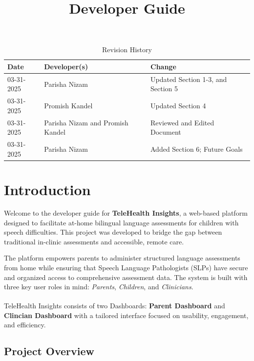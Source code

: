 \documentclass{article}
\title{Developer Guide\\\progname}
\author{\authname}
\date{}
\begin{document}
\maketitle
\newpage

\begin{table}[h!]
\caption{Revision History} \label{TblRevisionHistory}
\begin{tabularx}{\textwidth}{llX}
\toprule
\textbf{Date} & \textbf{Developer(s)} & \textbf{Change}\\
\midrule
03-31-2025 & Parisha Nizam & Updated Section 1-3, and Section 5\\
03-31-2025 & Promish Kandel & Updated Section 4\\
03-31-2025 & Parisha Nizam and Promish Kandel & Reviewed and Edited Document\\
03-31-2025 & Parisha Nizam & Added Section 6; Future Goals \\
\bottomrule
\end{tabularx}
\end{table}

\newpage


\tableofcontents


\newpage

\section{Introduction}

Welcome to the developer guide for \textbf{TeleHealth Insights}, a web-based platform designed to facilitate at-home bilingual language assessments for children with speech difficulties. This project was developed to bridge the gap between traditional in-clinic assessments and accessible, remote care. 

The platform empowers parents to administer structured language assessments from home while ensuring that Speech Language Pathologists (SLPs) have secure and organized access to comprehensive assessment data. 
The system is built with three key user roles in mind: \textit{Parents}, \textit{Children}, and \textit{Clinicians}. \\\\
TeleHealth Insights consists of two Dashboards:  \textbf{Parent Dashboard} and  \textbf{Clincian Dashboard} with a tailored interface focused on usability, engagement, and efficiency.

\subsection{Project Overview}
\end{document}
